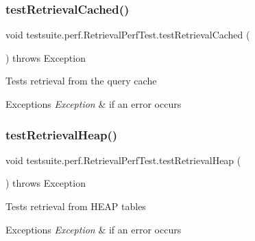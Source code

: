 \subsubsection{\texorpdfstring{test\+Retrieval\+Cached()}{testRetrievalCached()}}
{\footnotesize\ttfamily void testsuite.\+perf.\+Retrieval\+Perf\+Test.\+test\+Retrieval\+Cached (\begin{DoxyParamCaption}{ }\end{DoxyParamCaption}) throws Exception}

Tests retrieval from the query cache


\begin{DoxyExceptions}{Exceptions}
{\em Exception} & if an error occurs \\
\hline
\end{DoxyExceptions}
\mbox{\label{classtestsuite_1_1perf_1_1_retrieval_perf_test_af8c1a7c2f684c76b0e310bf7a97c3258}} 
\subsubsection{\texorpdfstring{test\+Retrieval\+Heap()}{testRetrievalHeap()}}
{\footnotesize\ttfamily void testsuite.\+perf.\+Retrieval\+Perf\+Test.\+test\+Retrieval\+Heap (\begin{DoxyParamCaption}{ }\end{DoxyParamCaption}) throws Exception}

Tests retrieval from H\+E\+AP tables


\begin{DoxyExceptions}{Exceptions}
{\em Exception} & if an error occurs \\
\hline
\end{DoxyExceptions}
\mbox{\label{classtestsuite_1_1perf_1_1_retrieval_perf_test_a7228eef6533f6ff301ae53d044e25f9e}} 
